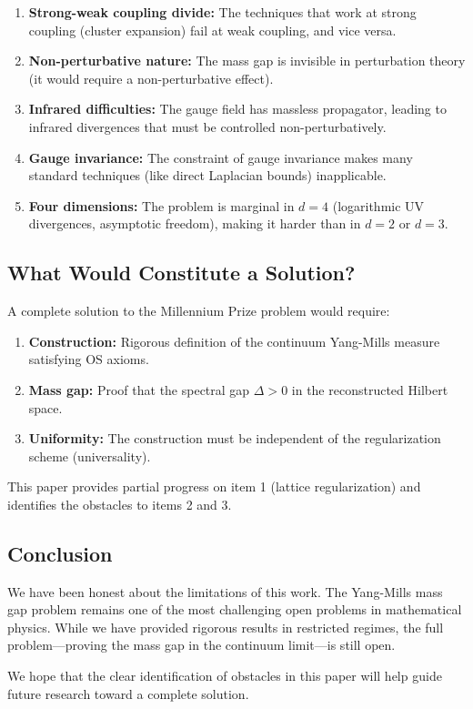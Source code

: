 \begin{enumerate}
    \item \textbf{Strong-weak coupling divide:} The techniques that work at strong coupling (cluster expansion) fail at weak coupling, and vice versa.
    
    \item \textbf{Non-perturbative nature:} The mass gap is invisible in perturbation theory (it would require a non-perturbative effect).
    
    \item \textbf{Infrared difficulties:} The gauge field has massless propagator, leading to infrared divergences that must be controlled non-perturbatively.
    
    \item \textbf{Gauge invariance:} The constraint of gauge invariance makes many standard techniques (like direct Laplacian bounds) inapplicable.
    
    \item \textbf{Four dimensions:} The problem is marginal in $d=4$ (logarithmic UV divergences, asymptotic freedom), making it harder than in $d=2$ or $d=3$.
\end{enumerate}

\subsection{What Would Constitute a Solution?}

A complete solution to the Millennium Prize problem would require:

\begin{enumerate}
    \item \textbf{Construction:} Rigorous definition of the continuum Yang-Mills measure satisfying OS axioms.
    
    \item \textbf{Mass gap:} Proof that the spectral gap $\Delta > 0$ in the reconstructed Hilbert space.
    
    \item \textbf{Uniformity:} The construction must be independent of the regularization scheme (universality).
\end{enumerate}

This paper provides partial progress on item 1 (lattice regularization) and identifies the obstacles to items 2 and 3.

\subsection{Conclusion}

We have been honest about the limitations of this work. The Yang-Mills mass gap problem remains one of the most challenging open problems in mathematical physics. While we have provided rigorous results in restricted regimes, the full problem---proving the mass gap in the continuum limit---is still open.

We hope that the clear identification of obstacles in this paper will help guide future research toward a complete solution.


